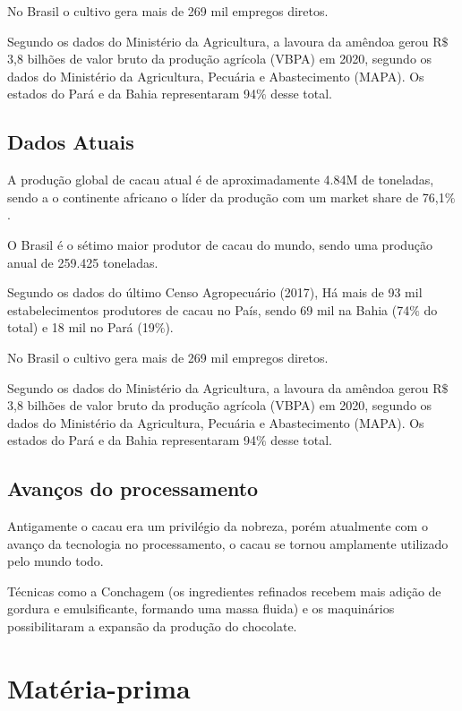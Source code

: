 \documentclass[
	12pt,				%
	openright,			%
	oneside,			%
	a4paper,			%
	english,			%
	french,				%
	spanish,			%
	brazil				%
	]{abntex2}
\begin{document}
No Brasil o cultivo gera mais de 269 mil empregos diretos.

Segundo os dados do Ministério da Agricultura, a lavoura da amêndoa gerou R$\$$ 3,8 bilhões de valor bruto da produção agrícola (VBPA) em 2020, segundo os dados do Ministério da Agricultura, Pecuária e Abastecimento (MAPA). Os estados do Pará e da Bahia representaram 94$\%$ desse total. \cite{8}

\subsection{Dados Atuais}

A produção global de cacau atual é de aproximadamente 4.84M de toneladas, sendo a o continente africano o líder da produção 	com um market share de 76,1$\%$. \cite{8}

O Brasil é o sétimo maior produtor de cacau do mundo, sendo uma produção anual de 259.425 toneladas.

Segundo os dados do último Censo Agropecuário (2017), Há mais de 93 mil estabelecimentos produtores de cacau no País, sendo 69 mil na Bahia (74$\%$ do total) e 18 mil no Pará (19$\%$). \cite{8}

No Brasil o cultivo gera mais de 269 mil empregos diretos.

Segundo os dados do Ministério da Agricultura, a lavoura da amêndoa gerou R$\$$ 3,8 bilhões de valor bruto da produção agrícola (VBPA) em 2020, segundo os dados do Ministério da Agricultura, Pecuária e Abastecimento (MAPA). Os estados do Pará e da Bahia representaram 94$\%$ desse total. \cite{8}


\subsection{Avanços do processamento}

Antigamente o cacau era um privilégio da nobreza, porém atualmente com o avanço da tecnologia no processamento, o cacau se tornou amplamente utilizado pelo mundo todo. \cite{9}

Técnicas como a Conchagem (os ingredientes refinados recebem mais adição de gordura e emulsificante, formando uma massa fluida) e os maquinários possibilitaram a expansão da produção do chocolate. \cite{9}

\section{Matéria-prima}
\end{document}
